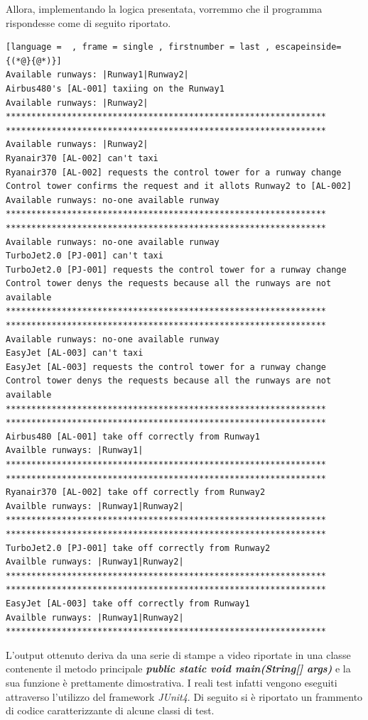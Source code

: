 \documentclass{article}
\begin{document}
\begin{sloppy}
Allora, implementando la logica presentata, vorremmo che il programma rispondesse come di seguito riportato.

\bigbreak
\begin{lstlisting}[language =  , frame = single , firstnumber = last , escapeinside={(*@}{@*)}]
Available runways: |Runway1|Runway2|
Airbus480's [AL-001] taxiing on the Runway1
Available runways: |Runway2|
***************************************************************
***************************************************************
Available runways: |Runway2|
Ryanair370 [AL-002] can't taxi
Ryanair370 [AL-002] requests the control tower for a runway change
Control tower confirms the request and it allots Runway2 to [AL-002]
Available runways: no-one available runway
***************************************************************
***************************************************************
Available runways: no-one available runway
TurboJet2.0 [PJ-001] can't taxi
TurboJet2.0 [PJ-001] requests the control tower for a runway change
Control tower denys the requests because all the runways are not available
***************************************************************
***************************************************************
Available runways: no-one available runway
EasyJet [AL-003] can't taxi
EasyJet [AL-003] requests the control tower for a runway change
Control tower denys the requests because all the runways are not available
***************************************************************
***************************************************************
Airbus480 [AL-001] take off correctly from Runway1
Availble runways: |Runway1|
***************************************************************
***************************************************************
Ryanair370 [AL-002] take off correctly from Runway2
Availble runways: |Runway1|Runway2|
***************************************************************
***************************************************************
TurboJet2.0 [PJ-001] take off correctly from Runway2
Availble runways: |Runway1|Runway2|
***************************************************************
***************************************************************
EasyJet [AL-003] take off correctly from Runway1
Availble runways: |Runway1|Runway2|
***************************************************************

\end{lstlisting}

\bigbreak
L'output ottenuto deriva da una serie di stampe a video riportate in una classe contenente il metodo principale \textbf{\textit{public static void main(String[] args)}} e la sua funzione è prettamente dimostrativa.
I reali test infatti vengono eseguiti attraverso l'utilizzo del framework \textit{JUnit4}. Di seguito si è riportato un frammento di codice caratterizzante di alcune classi di test.
\bigbreak


\end{sloppy}
\end{document}
